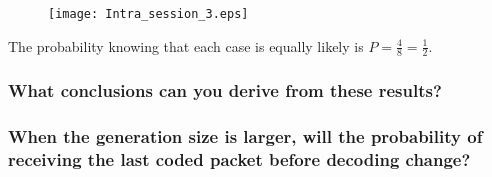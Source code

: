 \begin{figure}[!h]
  \centering
  \texttt{[image: Intra\_session\_3.eps]}
  \caption{}
  \label{fig:Intra_session_3}
\end{figure}
The probability knowing that each case is equally likely is $P=\frac{4}{8}=\frac{1}{2}$.\\
\subsubsection{What conclusions can you derive from these results?}

\subsubsection{When the generation size is larger, will the probability of receiving the last coded packet before decoding change?}

